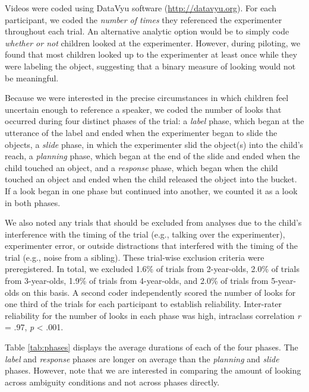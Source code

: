 \documentclass[english,man]{apa6}
\theoremstyle{definition}
\theoremstyle{definition}
\theoremstyle{definition}
\theoremstyle{remark}
\begin{document}
Videos were coded using DataVyu software (\url{http://datavyu.org}). For
each participant, we coded the \emph{number of times} they referenced
the experimenter throughout each trial. An alternative analytic option
would be to simply code \emph{whether or not} children looked at the
experimenter. However, during piloting, we found that most children
looked up to the experimenter at least once while they were labeling the
object, suggesting that a binary measure of looking would not be
meaningful.

Because we were interested in the precise circumstances in which
children feel uncertain enough to reference a speaker, we coded the
number of looks that occurred during four distinct phases of the trial:
a \emph{label} phase, which began at the utterance of the label and
ended when the experimenter began to slide the objects, a \emph{slide}
phase, in which the experimenter slid the object(s) into the child's
reach, a \emph{planning} phase, which began at the end of the slide and
ended when the child touched an object, and a \emph{response} phase,
which began when the child touched an object and ended when the child
released the object into the bucket. If a look began in one phase but
continued into another, we counted it as a look in both phases.

We also noted any trials that should be excluded from analyses due to
the child's interference with the timing of the trial (e.g., talking
over the experimenter), experimenter error, or outside distractions that
interfered with the timing of the trial (e.g., noise from a sibling).
These trial-wise exclusion criteria were preregistered. In total, we
excluded 1.6\% of trials from 2-year-olds, 2.0\% of trials from
3-year-olds, 1.9\% of trials from 4-year-olds, and 2.0\% of trials from
5-year-olds on this basis. A second coder independently scored the
number of looks for one third of the trials for each participant to
establish reliability. Inter-rater reliability for the number of looks
in each phase was high, intraclass correlation \emph{r} = .97, \emph{p}
\textless{} .001.

Table \ref{tab:phases} displays the average durations of each of the
four phases. The \emph{label} and \emph{response} phases are longer on
average than the \emph{planning} and \emph{slide} phases. However, note
that we are interested in comparing the amount of looking across
ambiguity conditions and not across phases directly.
\end{document}
